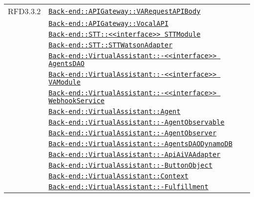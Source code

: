 \begin{longtable}{|>{\centering}m{3cm}|m{10cm}<{\centering}|}
RFD3.3.2 & \hyperref[Back-end::APIGateway::VARequestAPIBody]{\texttt{Back-end::APIGateway::VARequestAPIBody}}\\
& \hyperref[Back-end::APIGateway::VocalAPI]{\texttt{Back-end::APIGateway::VocalAPI}}\\
& \hyperref[Back-end::STT::<<interface>> STTModule]{\texttt{Back-end::STT::<<interface>> STTModule}}\\
& \hyperref[Back-end::STT::STTWatsonAdapter]{\texttt{Back-end::STT::STTWatsonAdapter}}\\
& \hyperref[Back-end::VirtualAssistant::<<interface>> AgentsDAO]{\texttt{Back-end::VirtualAssistant::-\linebreak <<interface>> AgentsDAO}}\\
& \hyperref[Back-end::VirtualAssistant::<<interface>> VAModule]{\texttt{Back-end::VirtualAssistant::-\linebreak <<interface>> VAModule}}\\
& \hyperref[Back-end::VirtualAssistant::<<interface>> WebhookService]{\texttt{Back-end::VirtualAssistant::-\linebreak <<interface>> WebhookService}}\\
& \hyperref[Back-end::VirtualAssistant::Agent]{\texttt{Back-end::VirtualAssistant::Agent}}\\
& \hyperref[Back-end::VirtualAssistant::AgentObservable]{\texttt{Back-end::VirtualAssistant::-\linebreak AgentObservable}}\\
& \hyperref[Back-end::VirtualAssistant::AgentObserver]{\texttt{Back-end::VirtualAssistant::-\linebreak AgentObserver}}\\
& \hyperref[Back-end::VirtualAssistant::AgentsDAODynamoDB]{\texttt{Back-end::VirtualAssistant::-\linebreak AgentsDAODynamoDB}}\\
& \hyperref[Back-end::VirtualAssistant::ApiAiVAAdapter]{\texttt{Back-end::VirtualAssistant::-\linebreak ApiAiVAAdapter}}\\
& \hyperref[Back-end::VirtualAssistant::ButtonObject]{\texttt{Back-end::VirtualAssistant::-\linebreak ButtonObject}}\\
& \hyperref[Back-end::VirtualAssistant::Context]{\texttt{Back-end::VirtualAssistant::Context}}\\
& \hyperref[Back-end::VirtualAssistant::Fulfillment]{\texttt{Back-end::VirtualAssistant::-\linebreak Fulfillment}}\\

\end{longtable}

